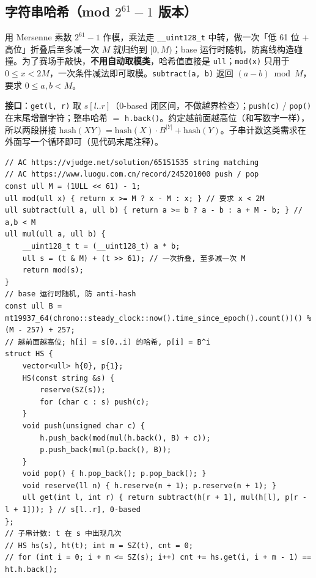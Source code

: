 \subsection{字符串哈希（mod $2^{61}-1$ 版本）}

用 Mersenne 素数 $2^{61}-1$ 作模，乘法走 \verb|__uint128_t| 中转，做一次「低 61 位 + 高位」折叠后至多减一次 $M$ 就归约到 $[0, M)$；base 运行时随机，防离线构造碰撞。为了赛场手敲快，\textbf{不用自动取模类}，哈希值直接是 \verb|ull|；\verb|mod(x)| 只用于 $0 \le x < 2M$，一次条件减法即可取模。\verb|subtract(a, b)| 返回 $(a-b)\bmod M$，要求 $0 \le a,b < M$。

\textbf{接口}：\verb|get(l, r)| 取 $s[l..r]$（0-based 闭区间，不做越界检查）；\verb|push(c)| / \verb|pop()| 在末尾增删字符；整串哈希 $=$ \verb|h.back()|。约定越前面越高位（和写数字一样），所以两段拼接 $\mathrm{hash}(XY) = \mathrm{hash}(X) \cdot B^{|Y|} + \mathrm{hash}(Y)$。子串计数这类需求在外面写一个循环即可（见代码末尾注释）。

\begin{verbatim}
// AC https://vjudge.net/solution/65151535 string matching
// AC https://www.luogu.com.cn/record/245201000 push / pop
const ull M = (1ULL << 61) - 1;
ull mod(ull x) { return x >= M ? x - M : x; } // 要求 x < 2M
ull subtract(ull a, ull b) { return a >= b ? a - b : a + M - b; } // a,b < M
ull mul(ull a, ull b) {
	__uint128_t t = (__uint128_t) a * b;
	ull s = (t & M) + (t >> 61); // 一次折叠, 至多减一次 M
	return mod(s);
}
// base 运行时随机, 防 anti-hash
const ull B = mt19937_64(chrono::steady_clock::now().time_since_epoch().count())() % (M - 257) + 257;
// 越前面越高位; h[i] = s[0..i) 的哈希, p[i] = B^i
struct HS {
	vector<ull> h{0}, p{1};
	HS(const string &s) {
		reserve(SZ(s));
		for (char c : s) push(c);
	}
	void push(unsigned char c) {
		h.push_back(mod(mul(h.back(), B) + c));
		p.push_back(mul(p.back(), B));
	}
	void pop() { h.pop_back(); p.pop_back(); }
	void reserve(ll n) { h.reserve(n + 1); p.reserve(n + 1); }
	ull get(int l, int r) { return subtract(h[r + 1], mul(h[l], p[r - l + 1])); } // s[l..r], 0-based
};
// 子串计数: t 在 s 中出现几次
// HS hs(s), ht(t); int m = SZ(t), cnt = 0;
// for (int i = 0; i + m <= SZ(s); i++) cnt += hs.get(i, i + m - 1) == ht.h.back();
\end{verbatim}
